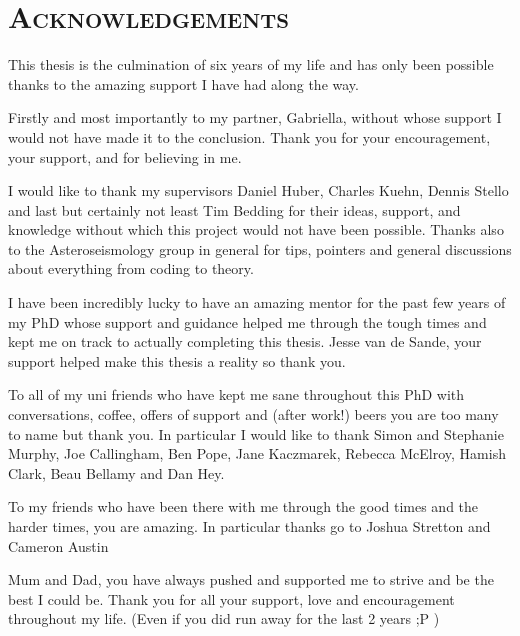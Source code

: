 \chapter*{\textsc{Acknowledgements}}

\vspace{-0.8cm}

This thesis is the culmination of six years of my life and has only been possible thanks to the amazing support I have had along the way. 

Firstly and most importantly to my partner, Gabriella, without whose support I would not have made it to the conclusion. Thank you for your encouragement, your support, and for believing in me. %

I would like to thank my supervisors Daniel Huber, Charles Kuehn, Dennis Stello and last but certainly not least Tim Bedding for their ideas, support, and knowledge without which this project would not have been possible. Thanks also to the Asteroseismology group in general for tips, pointers and general discussions about everything from coding to theory. 

I have been incredibly lucky to have an amazing mentor for the past few years of my PhD whose support and guidance helped me through the tough times and kept me on track to actually completing this thesis. Jesse van de Sande, your support helped make this thesis a reality so thank you.

To all of my uni friends who have kept me sane throughout this PhD with conversations, coffee, offers of support and (after work!) beers you are too many to name but thank you. In particular I would like to thank Simon and Stephanie Murphy, Joe Callingham, Ben Pope, Jane Kaczmarek, Rebecca McElroy, Hamish Clark, Beau Bellamy and Dan Hey. 

To my friends who have been there with me through the good times and the harder times, you are amazing. In particular thanks go to Joshua Stretton and Cameron Austin

Mum and Dad, you have always pushed and supported me to strive and be the best I could be. Thank you for all your support, love and encouragement throughout my life. (Even if you did run away for the last 2 years ;P )



